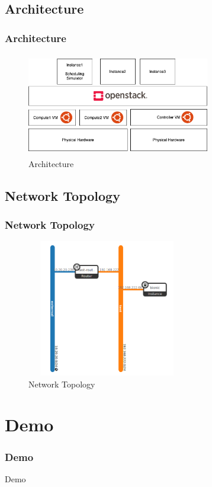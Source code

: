\documentclass[english,hangout]{beamer}
\begin{document}
\subsection{Architecture}
\begin{frame}
    \frametitle{Architecture}
    \begin{figure}
        \centerline{\includegraphics[height=4.5cm,width=8cm]{Architecture.png}}
        \caption {Architecture}
        \label{architecture}
    \end{figure}
\end{frame}

\subsection{Network Topology}
\begin{frame}
    \frametitle{Network Topology}
    \begin{figure}
        \centerline{\includegraphics[height=6cm,width=7cm]{Topology.png}}
        \caption {Network Topology}
        \label{openstackComponents}
    \end{figure}
\end{frame}

\section{Demo}
\begin{frame}[fragile]
 \frametitle{Demo}
    \begin{center}
        \vspace{-1.2em}
            Demo \cite{b4}
        \end{center}
\end{frame}
\end{document}
